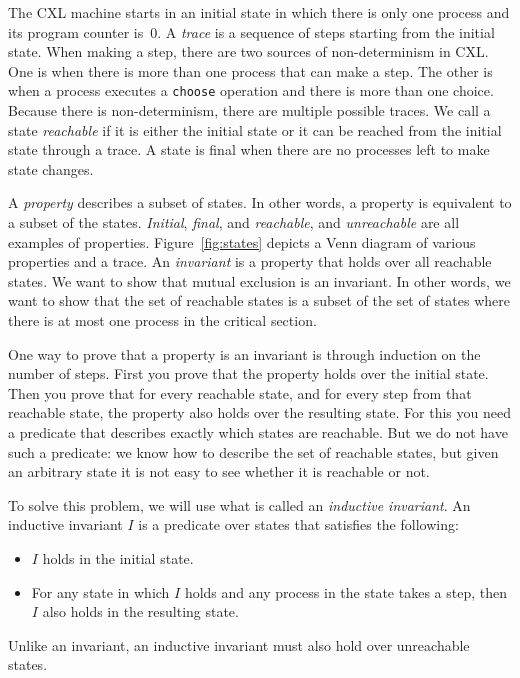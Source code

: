 \documentclass{report}
\begin{document}
The CXL machine starts in an initial state in which there is only
one process and its program counter is~0.  A \emph{trace} is a
sequence of steps starting from the initial state.
When making a step, there are two sources of non-determinism
in CXL.
One is when
there is more than one process that can make a step.  The other is
when a process executes a \texttt{choose} operation and there is
more than one choice.
Because there is non-determinism, there are multiple possible traces.
We call a state \emph{reachable} if it is either the initial state
or it can be reached from the initial state through a trace.
A state is final
when there are no processes left to make state changes.

A \emph{property} describes a subset of
states.  In other words, a property is equivalent to a subset of the states.
\emph{Initial}, \emph{final}, and \emph{reachable}, and \emph{unreachable}
are all examples of properties.
Figure~\ref{fig:states} depicts a Venn diagram of various properties
and a trace.
An \emph{invariant} is a property that holds over all reachable states.
We want to show that mutual exclusion is an invariant.
In other words, we want to show that the set of reachable states is a subset
of the set of states where there is at most one process in the critical
section.

One way to prove that a property is an invariant is through induction
on the number of steps.  First you prove that the property holds over
the initial state.  Then you prove that for every reachable state,
and for every step from that reachable state, the property also holds
over the resulting state.
For this you need a predicate that describes exactly which
states are reachable.
But we do not have such a predicate: we know how to describe the set
of reachable states, but given an arbitrary state it is not easy to
see whether it is reachable or not.

To solve this problem, we will use what is called an
\emph{inductive invariant}.
An inductive invariant $I$ is a predicate over states that satisfies the following:
\begin{itemize}
\item $I$ holds in the initial state.
\item For any state in which $I$ holds and any process in the
state takes a step, then $I$ also holds in the resulting state.
\end{itemize}
Unlike an invariant, an inductive invariant must also hold over unreachable states.
\end{document}
